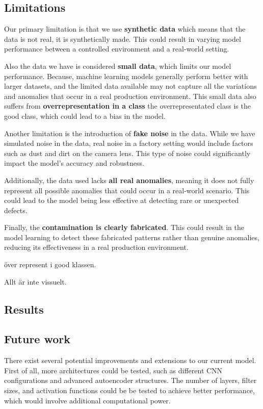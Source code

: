\subsection{Limitations}

Our primary limitation is that we use \textbf{synthetic data} which means that the data is not real, it is synthetically made.
This could result in varying model performance between a controlled environment and a real-world setting.

Also the data we have is considered \textbf{small data}, which limits our model performance. 
Because, machine learning models generally perform better with larger datasets, and the limited data available may not capture all the variations and anomalies that occur in a real production environment.
This small data also suffers from \textbf{overrepresentation in a class} the overrepresentated class is the good class, which could lead to a bias in the model. 

Another limitation is the introduction of \textbf{fake noise} in the data.
While we have simulated noise in the data, real noise in a factory setting would include factors such as dust and dirt on the camera lens. 
This type of noise could significantly impact the model's accuracy and robustness.

Additionally, the data used lacks \textbf{all real anomalies}, meaning it does not fully represent all possible anomalies that could occur in a real-world scenario. 
This could lead to the model being less effective at detecting rare or unexpected defects.

Finally, the \textbf{contamination is clearly fabricated}.
This could result in the model learning to detect these fabricated patterns rather than genuine anomalies, reducing its effectiveness in a real production environment.

över represent i good klassen.

Allt är inte vissuelt.
\subsection{Results}

\subsection{Future work}
There exist several potential improvements and extensions to our current model. 
First of all, more architectures could be tested, such as different CNN configurations and advanced autoencoder structures. 
The number of layers, filter sizes, and activation functions could be be tested to achieve better performance, which would involve additional computational power.

